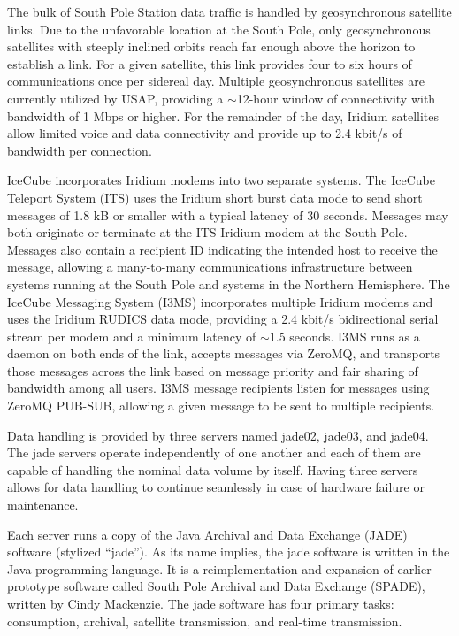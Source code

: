 The bulk of South Pole Station data traffic is handled by geosynchronous satellite links.  Due to the unfavorable
location at the South Pole, only geosynchronous satellites with steeply inclined orbits reach far enough above the
horizon to establish a link.  For a given satellite, this link provides four to six hours of communications once per
sidereal day.  Multiple geosynchronous satellites are currently utilized by USAP, providing a $\sim$12-hour window
of connectivity with bandwidth of 1 Mbps or higher.  For the remainder of the day, Iridium satellites allow
limited voice and data connectivity and provide up to 2.4 kbit/s of bandwidth per connection.

IceCube incorporates Iridium modems into two separate systems.  The IceCube Teleport System (ITS) uses the Iridium short burst
data mode to send short messages of 1.8 kB or smaller with a typical latency of 30 seconds.  Messages may both originate or terminate
at the ITS Iridium modem at the South Pole.  Messages also contain a recipient ID indicating the intended host to receive
the message, allowing a many-to-many communications infrastructure between systems running at the South Pole and systems
in the Northern Hemisphere.  The IceCube Messaging System (I3MS) incorporates multiple Iridium modems and uses the Iridium RUDICS
data mode, providing a 2.4 kbit/s bidirectional serial stream per modem and a minimum latency of $\sim$1.5 seconds.
I3MS runs as a daemon on both ends of the link, accepts messages via ZeroMQ, and transports those messages across the link
based on message priority and fair sharing of bandwidth among all users.  I3MS message recipients listen for messages
using ZeroMQ PUB-SUB, allowing a given message to be sent to multiple recipients.


Data handling is provided by three servers named jade02, jade03, and jade04. The jade servers operate independently of one another and
each of them are capable of handling the nominal data volume by itself. Having three servers allows for data handling to continue seamlessly
in case of hardware failure or maintenance.

Each server runs a copy of the Java Archival and Data Exchange (JADE) software (stylized “jade”). As its name implies, the jade software
is written in the Java programming language. It is a reimplementation and expansion of earlier prototype software called South Pole Archival
and Data Exchange (SPADE), written by Cindy Mackenzie. The jade software has four primary tasks: consumption, archival, satellite transmission, and real-time
transmission.

